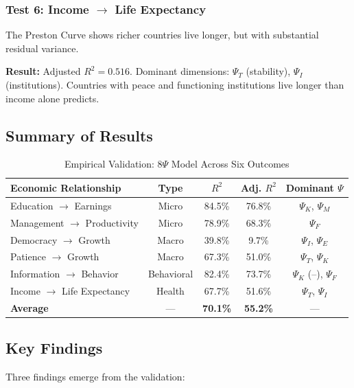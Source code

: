 \documentclass[12pt,a4paper]{article}
\begin{document}
\subsubsection{Test 6: Income $\rightarrow$ Life Expectancy}

The Preston Curve shows richer countries live longer, but with substantial residual variance.

\textbf{Result:} Adjusted $R^2 = 0.516$. Dominant dimensions: $\Psi_T$ (stability), $\Psi_I$ (institutions). Countries with peace and functioning institutions live longer than income alone predicts.

\subsection{Summary of Results}

\begin{table}[htbp]
\centering
\caption{Empirical Validation: 8$\Psi$ Model Across Six Outcomes}
\label{tab:psi-validation-appv}
\small
\begin{tabular}{@{}lcccc@{}}
\toprule
\textbf{Economic Relationship} & \textbf{Type} & \textbf{$R^2$} & \textbf{Adj. $R^2$} & \textbf{Dominant $\Psi$} \\
\midrule
Education $\rightarrow$ Earnings & Micro & 84.5\% & 76.8\% & $\Psi_K$, $\Psi_M$ \\
Management $\rightarrow$ Productivity & Micro & 78.9\% & 68.3\% & $\Psi_F$ \\
Democracy $\rightarrow$ Growth & Macro & 39.8\% & 9.7\% & $\Psi_I$, $\Psi_E$ \\
Patience $\rightarrow$ Growth & Macro & 67.3\% & 51.0\% & $\Psi_T$, $\Psi_K$ \\
Information $\rightarrow$ Behavior & Behavioral & 82.4\% & 73.7\% & $\Psi_K$ (--), $\Psi_F$ \\
Income $\rightarrow$ Life Expectancy & Health & 67.7\% & 51.6\% & $\Psi_T$, $\Psi_I$ \\
\midrule
\textbf{Average} & --- & \textbf{70.1\%} & \textbf{55.2\%} & --- \\
\bottomrule
\end{tabular}
\end{table}

\subsection{Key Findings}

Three findings emerge from the validation:
\end{document}
